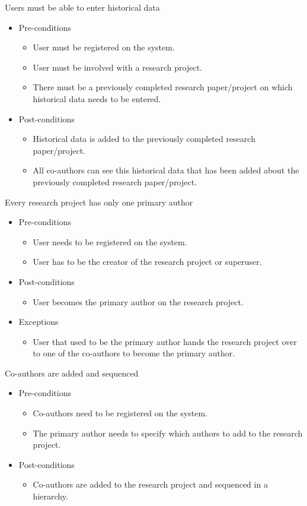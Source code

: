 \documentclass[a4paper,12pt]{report}
\begin{document}
	Users must be able to enter historical data
	\begin{itemize}
		\item Pre-conditions
			\begin{itemize}
				\item User must be registered on the system.
				\item User must be involved with a research project.
				\item There must be a previously completed research paper/project on which historical data needs to be entered.
			\end{itemize}
		\item Post-conditions
			\begin{itemize}
				\item Historical data is added to the previously completed research paper/project.
				\item All co-authors can see this historical data that has been added about the previously completed research paper/project.
			\end{itemize}
	\end{itemize}

	Every research project has only one primary author
	\begin{itemize}
		\item Pre-conditions
			\begin{itemize}
				\item User needs to be registered on the system.
				\item User has to be the creator of the research project or superuser.
			\end{itemize}
		\item Post-conditions
			\begin{itemize}
				\item User becomes the primary author on the research project.
			\end{itemize}
		\item Exceptions
			\begin{itemize}
				\item User that used to be the primary author hands the research project over to one of the co-authors to become the primary author.
			\end{itemize}
	\end{itemize}

	Co-authors are added and sequenced
	\begin{itemize}
		\item Pre-conditions
			\begin{itemize}
				\item Co-authors need to be registered on the system.
				\item The primary author needs to specify which authors to add to the research project.
			\end{itemize}
		\item Post-conditions
			\begin{itemize}
				\item Co-authors are added to the research project and sequenced in a hierarchy.
			\end{itemize}
	\end{itemize}
\end{document}
